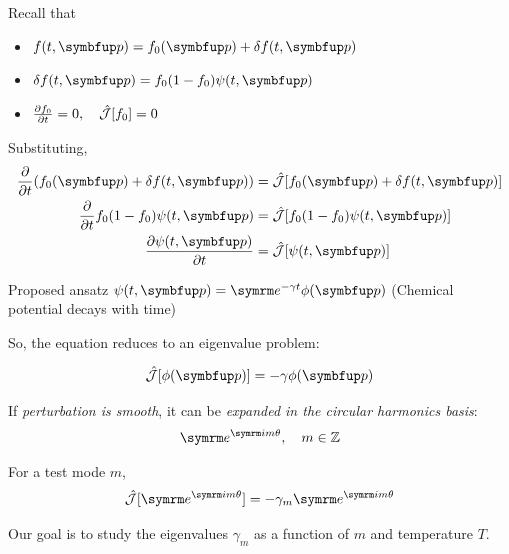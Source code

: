 \begin{frame}
  Recall that
  \begin{itemize}
    \item \(f(t, \vv{p}) = f_0(\vv{p}) + \fdif{f}(t, \vv{p})\)
    \item \(\fdif{f}(t, \vv{p}) = f_0(1 - f_0)\psi(t, \vv{p})\)
    \item \(\pdv{f_0}{t} = 0, \quad \hat{\mathcal{J}}[f_0] = 0\)
  \end{itemize}
  Substituting,
  \begin{align}
    \pdv*{(f_0(\vv{p}) + \fdif{f}(t, \vv{p}))}{t} & = \hat{\mathcal{J}}[f_0(\vv{p}) + \fdif{f}(t, \vv{p})] \\
    \pdv*{f_0(1 - f_0)\psi(t, \vv{p})}{t}         & = \hat{\mathcal{J}}[f_0(1 - f_0)\psi(t, \vv{p})]       \\
    \pdv{\psi(t, \vv{p})}{t}                      & = \hat{\mathcal{J}}[\psi(t, \vv{p})]
  \end{align}
\end{frame}

\begin{frame}
  \begin{blk}{Proposed ansatz}
    \(\psi(t, \vv{p}) = \e^{-\gamma t} \phi(\vv{p})\) (Chemical potential decays with time)
  \end{blk}
  So, the equation reduces to an eigenvalue problem:
  \begin{blk}{}
    \vspace{-\abovedisplayskip}
    \begin{equation}
      \hat{\mathcal{J}}[\phi(\vv{p})] = -\gamma \phi(\vv{p})
    \end{equation}
  \end{blk}
\end{frame}

\begin{frame}
  If \emph{perturbation is smooth}, it can be \emph{expanded in the circular harmonics basis}:
  \begin{equation}
    \e^{\im m \theta}, \quad m \in \mathbb{Z}
  \end{equation}

  For a test mode \(m\),
  \begin{equation}
    \hat{\mathcal{J}}[\e^{\im m \theta}] = -\gamma_m \e^{\im m \theta}
  \end{equation}

  Our goal is to study the eigenvalues \(\gamma_m\) as a function of \(m\) and temperature \(T\).
\end{frame}
